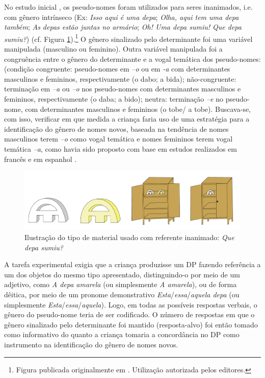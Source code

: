 \documentclass[output=paper]{LSP/langsci}
\begin{document}
No estudo inicial \citep{correaname2003}, os pseudo-nomes foram utilizados para seres inanimados, i.e. com gênero intrínseco (Ex: \textit{Isso aqui é uma depa}; \textit{Olha, aqui tem uma depa também}; \textit{As depas estão juntas no armário}; \textit{Oh! Uma depa sumiu! Que depa sumiu?}) (cf. Figura \ref{fig:correanp_1}).\footnote{Figura publicada originalmente em \citet{correaname2003}. Utilização autorizada pelos editores.} O gênero sinalizado pelo determinante foi uma variável manipulada (masculino ou feminino). Outra variável manipulada foi a congruência entre o gênero do determinante e a vogal temática dos pseudo-nomes: (condição congruente: pseudo-nomes em \textit{–o} ou em \textit{-a} com determinantes masculinos e femininos, respectivamente (o dabo; a bida); não-congruente: terminação em \textit{–a} ou \textit{–o} nos pseudo-nomes com determinantes masculinos e femininos, respectivamente (o daba; a bido); neutra: terminação \textit{–e} no pseudo-nome, com determinantes masculinos e femininos (o tobe/ a tobe). Buscava-se, com isso, verificar em que medida a criança faria uso de uma estratégia para a identificação do gênero de nomes novos, baseada na tendência de nomes masculinos terem \textit{–o} como vogal temática e nomes femininos terem vogal temática \textit{–a}, como havia sido proposto com base em estudos realizados em francês e em espanhol \citep{karmiloffsmith1979,perezpereira1991}.

\begin{figure}
\includegraphics[width=\textwidth]{figures/correanp1.pdf}
\caption{Ilustração do tipo de material usado com referente inanimado: \textit{Que depa sumiu?}}
\label{fig:correanp_1}
\end{figure}

A tarefa experimental exigia que a criança produzisse um DP fazendo referência a um dos objetos do mesmo tipo apresentado, distinguindo-o por meio de um adjetivo, como \textit{A depa amarela} (ou simplesmente \textit{A amarela}), ou de forma dêitica, por meio de um pronome demonstrativo  \textit{Esta}/\textit{essa}/\textit{aquela depa} (ou simplesmente \textit{Esta}/\textit{essa}/\textit{aquela}). Logo, em todas as possíveis respostas verbais, o gênero do pseudo-nome teria de ser codificado. O número de respostas em que o gênero sinalizado pelo determinante foi mantido (resposta-alvo) foi então tomado como informativo do quanto a criança tomaria a concordância no DP como instrumento na identificação do gênero de nomes novos.
\end{document}
